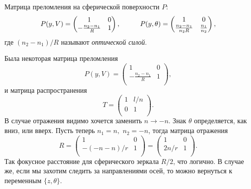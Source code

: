 Матрица преломления на сферической поверхности $P$:
\begin{equation}
    P(y, V) = \begin{pmatrix}
        1 & 0 \\
        -\frac{n_2-n_1}{R} & 1 \\
    \end{pmatrix},
    \hspace{1 cm}
    P(y, \theta) = 
    \begin{pmatrix}
        1 & 0 \\
        \frac{n_2-n_1}{n_2 R} & \frac{n_1}{n_2} \\
    \end{pmatrix},
\end{equation}
где $(n_2-n_1)/R$ называют \textit{оптической силой}.


Была некоторая матрица преломления
\begin{equation*}
     P(y, V) = \begin{pmatrix}
        1 & 0 \\
        -\frac{n_2-n_1}{R} & 1 \\
    \end{pmatrix},
\end{equation*}
и матрица распространения
\begin{equation*}
    T = \begin{pmatrix}
        1 & l/n \\
        0 & 1 \\
    \end{pmatrix}.
\end{equation*}
В случае отражения видимо хочется заменить $n \to -n$. Знак $\theta$ определяется, как вниз, или вверх.
Пусть теперь $n_1=n,$ $n_2=-n$, тогда матрица отражения
\begin{equation*}
    R = \begin{pmatrix}
        1 & 0 \\
        -(-n-n)/r & 1 \\
    \end{pmatrix} = \begin{pmatrix}
        1 & 0 \\
        2n/r & 1 \\
    \end{pmatrix}.
\end{equation*}
Так фокусное расстояние для сферического зеркала $R/2$, что логично. В случае же, если мы захотим следить за направлениями осей, то можно вернуться к переменным $\{z, \theta\}$.


